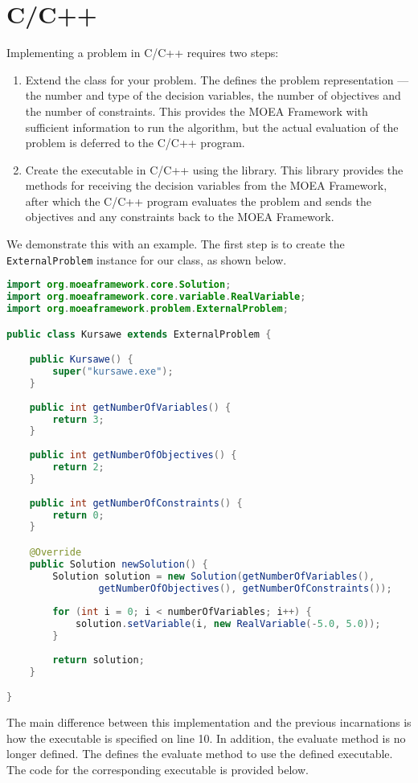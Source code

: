 \section{C/C++}
Implementing a problem in C/C++ requires two steps:
\begin{enumerate}
  \item Extend the  class for your problem.  The  defines the problem representation --- the number and type of the decision variables, the number of objectives and the number of constraints.  This provides the MOEA Framework with sufficient information to run the algorithm, but the actual evaluation of the problem is deferred to the C/C++ program.
  \item Create the executable in C/C++ using the  library.  This library provides the methods for receiving the decision variables from the MOEA Framework, after which the C/C++ program evaluates the problem and sends the objectives and any constraints back to the MOEA Framework.
\end{enumerate}

We demonstrate this with an example.  The first step is to create the \texttt{ExternalProblem} instance for our class, as shown below.

\begin{lstlisting}[language=Java]
import org.moeaframework.core.Solution;
import org.moeaframework.core.variable.RealVariable;
import org.moeaframework.problem.ExternalProblem;

public class Kursawe extends ExternalProblem {

	public Kursawe() {
		super("kursawe.exe");
	}
	
	public int getNumberOfVariables() {
		return 3;
	}
	
	public int getNumberOfObjectives() {
		return 2;
	}
	
	public int getNumberOfConstraints() {
		return 0;
	}

	@Override
	public Solution newSolution() {
		Solution solution = new Solution(getNumberOfVariables(), 
				getNumberOfObjectives(), getNumberOfConstraints());
 
		for (int i = 0; i < numberOfVariables; i++) {
			solution.setVariable(i, new RealVariable(-5.0, 5.0));
		}
 
		return solution;
	}

}
\end{lstlisting}

The main difference between this implementation and the previous incarnations is how the executable is specified on line 10.  In addition, the evaluate method is no longer defined.  The  defines the evaluate method to use the defined executable.  The code for the corresponding executable is provided below.

